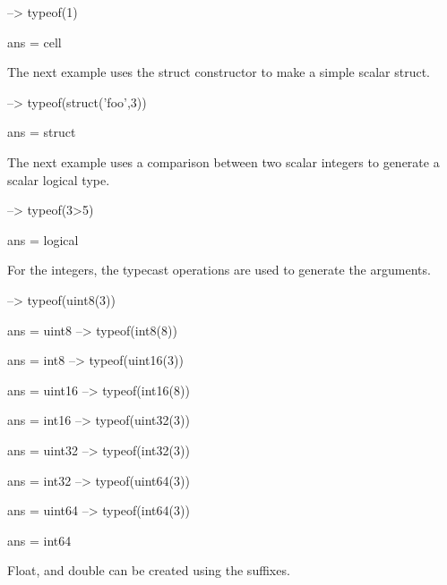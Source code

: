 \begin{DoxyVerbInclude}
--> typeof({1})

ans = 
cell
\end{DoxyVerbInclude}


The next example uses the {\ttfamily struct} constructor to make a simple scalar struct.


\begin{DoxyVerbInclude}
--> typeof(struct('foo',3))

ans = 
struct
\end{DoxyVerbInclude}


The next example uses a comparison between two scalar integers to generate a scalar logical type.


\begin{DoxyVerbInclude}
--> typeof(3>5)

ans = 
logical
\end{DoxyVerbInclude}


For the integers, the typecast operations are used to generate the arguments.


\begin{DoxyVerbInclude}
--> typeof(uint8(3))

ans = 
uint8
--> typeof(int8(8))

ans = 
int8
--> typeof(uint16(3))

ans = 
uint16
--> typeof(int16(8))

ans = 
int16
--> typeof(uint32(3))

ans = 
uint32
--> typeof(int32(3))

ans = 
int32
--> typeof(uint64(3))

ans = 
uint64
--> typeof(int64(3))

ans = 
int64
\end{DoxyVerbInclude}


Float, and double can be created using the suffixes.


